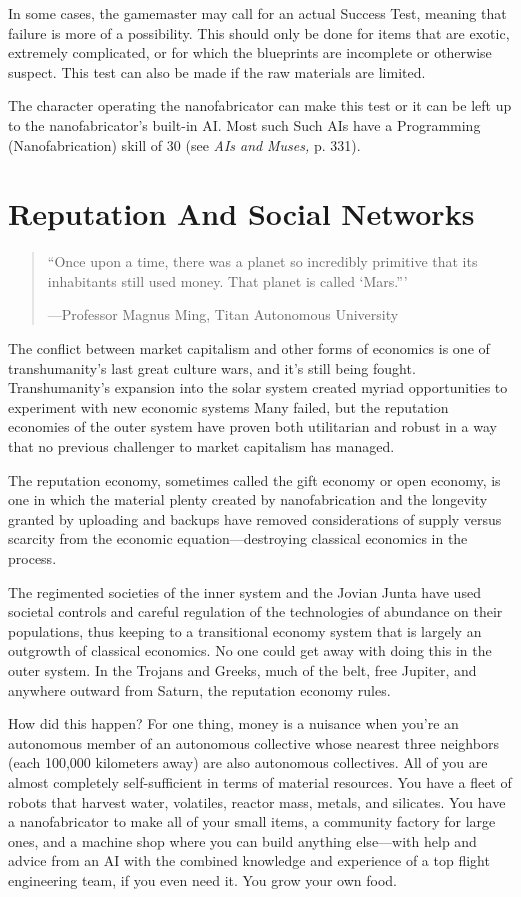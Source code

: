 In some cases, the gamemaster may call for an actual Success Test, meaning that failure is more of a possibility. This should only be done for items that are exotic, extremely complicated, or for which the blueprints are incomplete or otherwise suspect. This test can also be made if the raw materials are limited. 

The character operating the nanofabricator can make this test or it can be left up to the nanofabricator's built-in AI. Most such Such AIs have a Programming (Nanofabrication) skill of 30 (see \textit{AIs and } \textit{Muses,} p. 331). 

\section{Reputation And Social Networks} 

\begin{quote} ``Once upon a time, there was a planet so incredibly primitive that its inhabitants still used money. That planet is called ‘Mars.''' 

—Professor Magnus Ming, Titan Autonomous University \end{quote} 

The conflict between market capitalism and other forms of economics is one of transhumanity's last great culture wars, and it's still being fought. Transhumanity's expansion into the solar system created myriad opportunities to experiment with new economic systems Many failed, but the reputation economies of the outer system have proven both utilitarian and robust in a way that no previous challenger to market capitalism has managed. 

The reputation economy, sometimes called the gift economy or open economy, is one in which the material plenty created by nanofabrication and the longevity granted by uploading and backups have removed considerations of supply versus scarcity from the economic equation—destroying classical economics in the process. 

The regimented societies of the inner system and the Jovian Junta have used societal controls and careful regulation of the technologies of abundance on their populations, thus keeping to a transitional economy system that is largely an outgrowth of classical economics. No one could get away with doing this in the outer system. In the Trojans and Greeks, much of the belt, free Jupiter, and anywhere outward from Saturn, the reputation economy rules. 

How did this happen? For one thing, money is a nuisance when you're an autonomous member of an autonomous collective whose nearest three neighbors (each 100,000 kilometers away) are also autonomous collectives. All of you are almost completely self-sufficient in terms of material resources. You have a fleet of robots that harvest water, volatiles, reactor mass, metals, and silicates. You have a nanofabricator to make all of your small items, a community factory for large ones, and a machine shop where you can build anything else—with help and advice from an AI with the combined knowledge and experience of a top flight engineering team, if you even need it. You grow your own food. 



